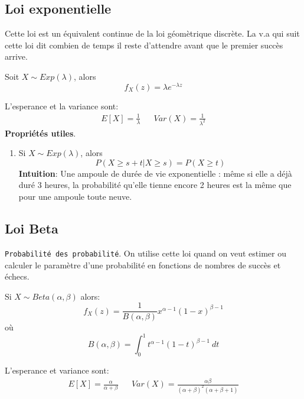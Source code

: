 \documentclass[a4paper]{article}
\begin{document}
\subsection{Loi exponentielle}
Cette loi est un équivalent continue de la loi géomètrique discrète.
La v.a qui suit cette loi dit combien de temps il reste d'attendre avant que le
premier succès arrive.

Soit $X \sim Exp(\lambda)$, alors
 \[
     f_X(z) = \lambda e^{-\lambda z}
\] 

L'esperance et la variance sont:
\begin{align*}
    E[X] = \frac{1}{\lambda} & & Var(X) = \frac{1}{\lambda^2}
\end{align*}
\textbf{Propriétés utiles}.
\begin{enumerate}
    \item Si $X \sim Exp(\lambda)$, alors
         \[
        P(X \ge s + t | X \ge s) = P(X \ge t)
        \] 
        \textbf{Intuition}: Une ampoule de durée de vie exponentielle :
        même si elle a déjà duré 3 heures, la probabilité qu’elle tienne
        encore 2 heures est la même que pour une ampoule toute neuve.
\end{enumerate}

\subsection{Loi Beta}
\texttt{Probabilité des probabilité}. On utilise cette loi quand on veut
estimer ou calculer le paramètre d'une probabilité en fonctions de nombres de
succès et échecs.

Si $X \sim Beta(\alpha, \beta)$ alors:
\[
    f_X(z) = \frac{1}{B(\alpha, \beta)}x^{\alpha-1}(1 - x)^{\beta - 1}
\] 
où
\[
    B(\alpha, \beta) = \int_{{0}}^{{1}} {t^{\alpha-1} (1-t)^{\beta - 1}} \: d{t} {}
\] 

L'esperance et variance sont:
 \begin{align*}
     E[X] = \frac{\alpha}{\alpha + \beta} & & Var(X) = \frac{\alpha \beta}{(\alpha + \beta)^2 (\alpha + \beta + 1)}
\end{align*}
\end{document}

